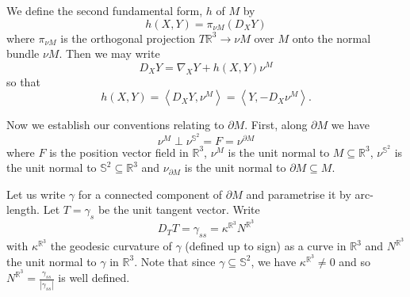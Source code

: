 \documentclass[10pt]{amsart}
\newcommand{\IP}[2]{\left< #1 , #2 \right>}
\newcommand{\R}{\ensuremath{\mathbb{R}}}
\renewcommand{\S}{\ensuremath{\mathbb{S}}}
\theoremstyle{remark}
\begin{document}
We define the second fundamental form, \(h\) of \(M\) by
\[
h(X, Y) = \pi_{\nu M} (D_X Y)
\]
where \(\pi_{\nu M}\) is the orthogonal projection \(T\R^3 \to \nu M\) over \(M\) onto the normal bundle \(\nu M\). Then we may write
\begin{equation}
\label{eq:gauss}
D_X Y = \nabla_X Y + h(X, Y) \nu^M
\end{equation}
so that
\begin{equation}
\label{eq:sff}
h(X, Y) = \IP{D_X Y}{\nu^M} = \IP{Y}{-D_X \nu^M}.
\end{equation}

Now we establish our conventions relating to \(\partial M\). First, along \(\partial M\) we have
\begin{equation}
\label{eq:boundary_orthgonal}
\nu^M \perp \nu^{\S^2} = F = \nu^{\partial M}
\end{equation}
where \(F\) is the position vector field in \(\R^3\), \(\nu^M\) is the unit normal to \(M \subseteq \R^3\), \(\nu^{\S^2}\) is the unit normal to \(\S^2 \subseteq \R^3\) and \(\nu_{\partial M}\) is the unit normal to \(\partial M \subseteq M\).

Let us write \(\gamma\) for a connected component of \(\partial M\) and parametrise it by arc-length. Let \(T = \gamma_s\) be the unit tangent vector. Write
\begin{equation}
\label{eq:euclidean_kappa}
D_T T = \gamma_{ss} = \kappa^{\R^3} N^{\R^3}
\end{equation}
with \(\kappa^{\R^3}\) the geodesic curvature of \(\gamma\) (defined up to sign) as a curve in \(\R^3\) and \(N^{\R^3}\) the unit normal to \(\gamma\) in \(\R^3\). Note that since \(\gamma \subseteq \S^2\), we have \(\kappa^{\R^3} \ne 0\) and so \(N^{\R^3} = \tfrac{\gamma_{ss}}{|\gamma_{ss}|}\) is well defined.
\end{document}

